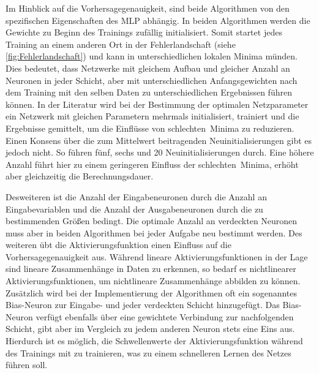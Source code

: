 Im Hinblick auf die Vorhersagegenauigkeit, sind beide Algorithmen von den spezifischen Eigenschaften des MLP abhängig. In beiden Algorithmen werden die Gewichte zu Beginn des Trainings zufällig initialisiert. Somit startet jedes Training an einem anderen Ort in der Fehlerlandschaft (siehe \autoref{fig:Fehlerlandschaft}) und kann in unterschiedlichen lokalen Minima münden. Dies bedeutet, dass Netzwerke mit gleichem Aufbau und gleicher Anzahl an Neuronen in jeder Schicht, aber mit unterschiedlichen Anfangsgewichten nach dem Training mit den selben Daten zu unterschiedlichen Ergebnissen führen können. In der Literatur wird bei der Bestimmung der optimalen Netzparameter ein Netzwerk mit gleichen Parametern mehrmals initialisiert, trainiert und die Ergebnisse gemittelt, um die Einflüsse von \glqq schlechten\grqq~Minima zu reduzieren. Einen Konsens über die zum Mittelwert beitragenden Neuinitialisierungen gibt es jedoch nicht. So führen \citet{Domanski2017} fünf, \citet{Keles2016} sechs und \citet{Monteiro2016} 20 Neuinitialisierungen durch. Eine höhere Anzahl führt hier zu einem geringeren Einfluss der \glqq schlechten\grqq~Minima, erhöht aber gleichzeitig die Berechnungsdauer.

Desweiteren ist die Anzahl der Eingabeneuronen durch die Anzahl an Eingabevariablen und die Anzahl der Ausgabeneuronen durch die zu bestimmenden Größen bedingt. Die optimale Anzahl an verdeckten Neuronen muss aber in beiden Algorithmen bei jeder Aufgabe neu bestimmt werden. Des weiteren übt die Aktivierungsfunktion einen Einfluss auf die Vorhersagegenauigkeit aus. Während lineare Aktivierungsfunktionen in der Lage sind lineare Zusammenhänge in Daten zu erkennen, so bedarf es nichtlinearer Aktivierungsfunktionen, um nichtlineare Zusammenhänge abbilden zu können.\, Zusätzlich wird bei der Implementierung der Algorithmen oft ein sogenanntes Bias-Neuron zur Eingabe- und jeder verdeckten Schicht hinzugefügt. Das Bias-Neuron verfügt ebenfalls über eine gewichtete Verbindung zur nachfolgenden Schicht, gibt aber im Vergleich zu jedem anderen Neuron stets eine Eins aus. Hierdurch ist es möglich, die Schwellenwerte der Aktivierungsfunktion während des Trainings mit zu trainieren, was zu einem schnelleren Lernen des Netzes führen soll.\,